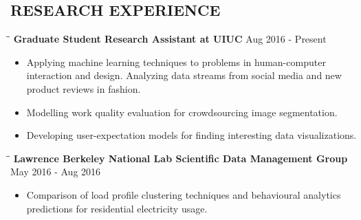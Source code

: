 \documentclass{res}
\begin{document}
\begin{resume}
\section{RESEARCH EXPERIENCE}
\vspace{-10pt}
     \begin{tabbing}
   \hspace{2.3in}\= \hspace{2.6in}\= \kill 
   \vspace{-20pt}
    {\bf Graduate Student Research Assistant at UIUC}  \>\hspace{205pt}  Aug 2016 - Present
        \\ %
   \end{tabbing}    
    \begin{itemize}
     \vspace{-20pt}
     \item  Applying machine learning techniques to problems in human-computer interaction and design. Analyzing data streams from social media  and new product reviews in fashion. 
     \item Modelling work quality evaluation for crowdsourcing image segmentation.
     \item Developing user-expectation models for finding interesting data visualizations.
     \end{itemize}
\vspace{-20pt}     
     \begin{tabbing}
   \hspace{2.3in}\= \hspace{2.6in}\= \kill 
   \vspace{-20pt}
    {\bf Lawrence Berkeley National Lab Scientific Data Management Group}  \>\hspace{195pt}  May 2016 - Aug 2016
        \\ 
   \end{tabbing}    
    \begin{itemize}
     \vspace{-20pt}
     \item  Comparison of load profile clustering techniques and behavioural analytics \\predictions for residential electricity usage. 
     \end{itemize}
     \vspace{-20pt}   

\end{resume}
\end{document}
